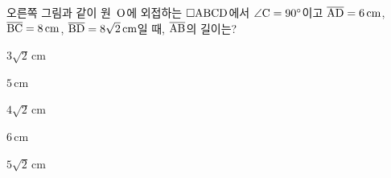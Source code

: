 \noindent\begin{minipage}[t]{0.58\linewidth}\vspace{0pt}\raggedright 오른쪽 그림과 같이 원~$\mathrm{O}$에 외접하는 $\square\mathrm{ABCD}$에서 $\angle\mathrm{C}=90^\circ$이고 $\overline{\mathrm{AD}}=6\,\mathrm{cm}$, $\overline{\mathrm{BC}}=8\,\mathrm{cm}$, $\overline{\mathrm{BD}}=8\sqrt{2}\,\mathrm{cm}$일 때, $\overline{\mathrm{AB}}$의 길이는?\end{minipage}\hfill\begin{minipage}[t]{0.4\linewidth}\vspace{0pt}\centering \resizebox{\ifdim\width>\linewidth\linewidth\else\width\fi}{!}{}\end{minipage}\par
\begin{choices32}{\rule[-3ex]{0pt}{8ex}$3\sqrt{2}\,\mathrm{cm}$}{\rule[-3ex]{0pt}{8ex}$5\,\mathrm{cm}$}{\rule[-3ex]{0pt}{8ex}$4\sqrt{2}\,\mathrm{cm}$}{\rule[-3ex]{0pt}{8ex}$6\,\mathrm{cm}$}{\rule[-3ex]{0pt}{8ex}$5\sqrt{2}\,\mathrm{cm}$}\end{choices32}
